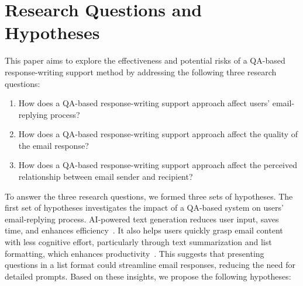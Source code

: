 \section{Research Questions and Hypotheses}
This paper aims to explore the effectiveness and potential risks of a QA-based response-writing support method by addressing the following three research questions:

\begin{enumerate}[RQ1:]
    \item How does a QA-based response-writing support approach affect users’ email-replying process?
    \item How does a QA-based response-writing support approach affect the quality of the email response?
    \item How does a QA-based response-writing support approach affect the perceived relationship between email sender and recipient?
\end{enumerate}

To answer the three research questions, we formed three sets of hypotheses.
The first set of hypotheses investigates the impact of a QA-based system on users' email-replying process.
AI-powered text generation reduces user input, saves time, and enhances efficiency~\cite{bastola2024llmbasedsmartreplylsr}. 
It also helps users quickly grasp email content with less cognitive effort, particularly through text summarization and list formatting, which enhances productivity~\cite{tarnpradab2017toward, nandhini2013use, modaresi2017commercial, daniel1998influence}. 
This suggests that presenting questions in a list format could streamline email responses, reducing the need for detailed prompts. 
Based on these insights, we propose the following hypotheses:

